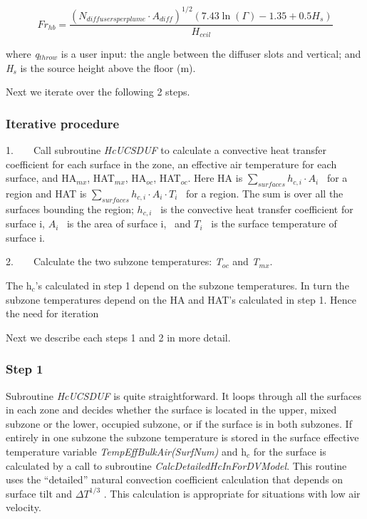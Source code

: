\begin{equation}
F{r_{hb}} = \frac{{{{({N_{diffusersperplume}}\cdot {A_{diff}})}^{1/2}}(7.43\ln (\Gamma ) - 1.35 + 0.5{H_s})}}{{{H_{ceil}}}}
\end{equation}

where \emph{q\(_{throw}\)} is a user input: the angle between the diffuser slots and vertical; and \emph{H\(_{s}\)} is the source height above the floor (m).

Next we iterate over the following 2 steps.

\subsubsection{Iterative procedure}\label{iterative-procedure-1}

1.~~~~Call subroutine \emph{HcUCSDUF} to calculate a convective heat transfer coefficient for each surface in the zone, an effective air temperature for each surface, and HA\(_{mx}\), HAT\(_{mx}\), HA\(_{oc}\), HAT\(_{oc}\). Here HA is \(\sum\limits_{surfaces} {{h_{c,i}} \cdot {A_i}}\) ~for a region and HAT is \(\sum\limits_{surfaces} {{h_{c,i}} \cdot {A_i}} \cdot {T_i}\) ~for a region. The sum is over all the surfaces bounding the region; \({{h_{c,i}}}\) ~is the convective heat transfer coefficient for surface i, \({A_i}\) ~is the area of surface i,~ and \({T_i}\) ~is the surface temperature of surface i.

2.~~~~Calculate the two subzone temperatures: \emph{T\(_{oc}\)} and \emph{T\(_{mx}\)}.

The h\(_{c}\)'s calculated in step 1 depend on the subzone temperatures. In turn the subzone temperatures depend on the HA and HAT's calculated in step 1. Hence the need for iteration

Next we describe each steps 1 and 2 in more detail.

\subsubsection{Step 1}\label{step-1-1}

Subroutine \emph{HcUCSDUF} is quite straightforward. It loops through all the surfaces in each zone and decides whether the surface is located in the upper, mixed subzone or the lower, occupied subzone, or if the surface is in both subzones. If entirely in one subzone the subzone temperature is stored in the surface effective temperature variable \emph{TempEffBulkAir(SurfNum)} and h\(_{c}\) for the surface is calculated by a call to subroutine \emph{CalcDetailedHcInForDVModel}. This routine uses the ``detailed'' natural convection coefficient calculation that depends on surface tilt and \(\Delta {T^{1/3}}\) . This calculation is appropriate for situations with low air velocity.

